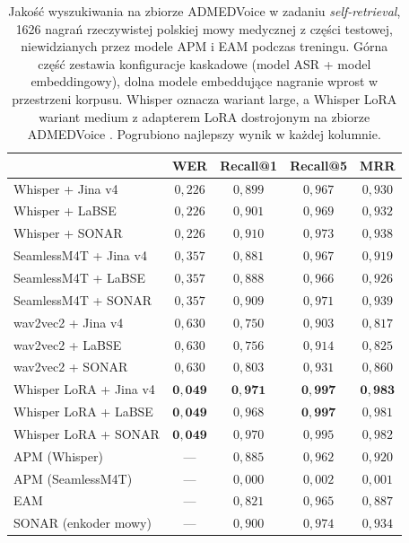 \begin{table}[htbp]
\centering
\small
\begin{tabular}{@{}lcccc@{}}
\toprule
& \textbf{WER} & \textbf{Recall@1} & \textbf{Recall@5} & \textbf{MRR} \\
\midrule
Whisper + Jina v4                  & $0{,}226$ & $0{,}899$ & $0{,}967$ & $0{,}930$ \\
Whisper + LaBSE                    & $0{,}226$ & $0{,}901$ & $0{,}969$ & $0{,}932$ \\
Whisper + SONAR                    & $0{,}226$ & $0{,}910$ & $0{,}973$ & $0{,}938$ \\
SeamlessM4T + Jina v4              & $0{,}357$ & $0{,}881$ & $0{,}967$ & $0{,}919$ \\
SeamlessM4T + LaBSE                & $0{,}357$ & $0{,}888$ & $0{,}966$ & $0{,}926$ \\
SeamlessM4T + SONAR                & $0{,}357$ & $0{,}909$ & $0{,}971$ & $0{,}939$ \\
wav2vec2 + Jina v4                 & $0{,}630$ & $0{,}750$ & $0{,}903$ & $0{,}817$ \\
wav2vec2 + LaBSE                   & $0{,}630$ & $0{,}756$ & $0{,}914$ & $0{,}825$ \\
wav2vec2 + SONAR                   & $0{,}630$ & $0{,}803$ & $0{,}931$ & $0{,}860$ \\
Whisper LoRA + Jina v4             & $\mathbf{0{,}049}$ & $\mathbf{0{,}971}$ & $\mathbf{0{,}997}$ & $\mathbf{0{,}983}$ \\
Whisper LoRA + LaBSE               & $\mathbf{0{,}049}$ & $0{,}968$ & $\mathbf{0{,}997}$ & $0{,}981$ \\
Whisper LoRA + SONAR               & $\mathbf{0{,}049}$ & $0{,}970$ & $0{,}995$ & $0{,}982$ \\
\midrule
APM (Whisper)                      & ---       & $0{,}885$ & $0{,}962$ & $0{,}920$ \\
APM (SeamlessM4T)                  & ---       & $0{,}000$ & $0{,}002$ & $0{,}001$ \\
EAM                                & ---       & $0{,}821$ & $0{,}965$ & $0{,}887$ \\
SONAR (enkoder mowy)               & ---       & $0{,}900$ & $0{,}974$ & $0{,}934$ \\
\bottomrule
\end{tabular}
\caption{Jakość wyszukiwania na zbiorze ADMEDVoice w zadaniu \textit{self-retrieval}, 1626
nagrań rzeczywistej polskiej mowy medycznej z części testowej, niewidzianych przez modele
APM i EAM podczas treningu. Górna część zestawia konfiguracje kaskadowe
(model ASR + model embeddingowy), dolna modele embeddujące nagranie wprost w przestrzeni
korpusu. Whisper oznacza wariant large, a Whisper LoRA wariant medium z adapterem LoRA
dostrojonym na zbiorze ADMEDVoice \cite{ADMEDVoice}. Pogrubiono najlepszy wynik w każdej kolumnie.}
\label{tab:admedCzyste}
\end{table}


